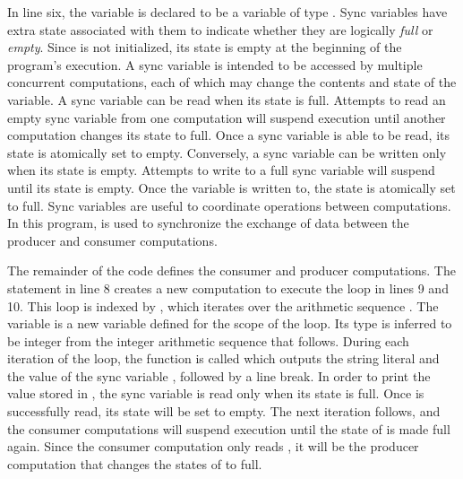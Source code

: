 In line six, the variable  is declared to be a  variable 
of type .  Sync variables have extra state associated with them to 
indicate whether they are logically {\em full} or {\em empty}.  Since 
is not initialized, its state is empty at the beginning of the program's execution.
A sync variable
is intended to be accessed by multiple concurrent computations, each of which may
change the contents and state of the variable.  A sync variable
can be read when its state is full.  Attempts to read an empty sync variable from one
computation will suspend execution until another computation changes its state to full.  
Once a sync variable is able to be read, its state is atomically set to empty.  
Conversely, a sync variable can be written only when its state is empty.  Attempts
to write to a full sync variable will suspend until its state is empty.  Once the variable
is written to, the state is atomically set to full.  Sync variables are useful
to coordinate operations between computations.  In this program,  is used
to synchronize the exchange of data between the producer and consumer computations.

The remainder of the code defines the consumer and producer computations.
The  statement in line 8 creates a new computation to execute the 
loop in lines 9 and 10.  This loop is indexed by , which iterates over
the arithmetic sequence .  The variable  is a new
variable defined for the scope of the loop.  Its type is inferred to be integer from
the integer arithmetic sequence that follows.  During each iteration of the 
loop, the  function is called which outputs the string
literal  and the value of the sync variable , 
followed by a line break.  In order to print the value stored in , the
sync variable is read only when its state is full.  Once  is successfully
read, its state will be set to empty.  The next iteration follows, and the 
consumer computations will suspend execution until the state of  is 
made full again.  Since the consumer computation only reads , it will be 
the producer computation that changes the states of  to full.

